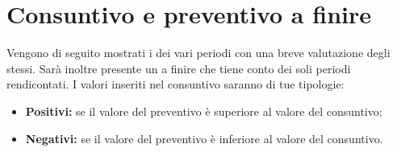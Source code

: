 \section{Consuntivo e preventivo a finire}
\label{consuntivo_preventivo_a_finire}
Vengono di seguito mostrati i  dei vari periodi con una breve valutazione degli stessi. Sarà inoltre presente un  a finire che tiene conto dei soli periodi rendicontati. I valori inseriti nel consuntivo saranno di tue tipologie:
\begin {itemize}
	\item \textbf{Positivi:} se il valore del preventivo è superiore al valore del consuntivo;
	\item \textbf{Negativi:} se il valore del preventivo è inferiore al valore del consuntivo.
\end{itemize}


